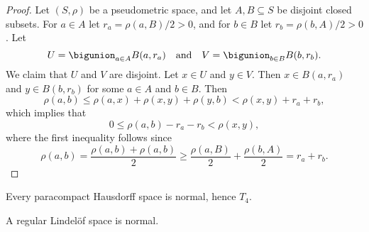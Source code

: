 \documentclass[article, a4paper, 11pt, oneside]{memoir}
\numberwithin{equation}{chapter}
\begin{document}
\begin{proof}
    Let $(S,\rho)$ be a pseudometric space, and let $A, B \subseteq S$ be disjoint closed subsets. For $a \in A$ let $r_a = \rho(a,B)/2 > 0$, and for $b \in B$ let $r_b = \rho(b,A)/2 > 0$. Let
    \begin{equation*}
        U = \bigunion_{a \in A} B(a,r_a)
        \quad \text{and} \quad
        V = \bigunion_{b \in B} B(b,r_b).
    \end{equation*}
    We claim that $U$ and $V$ are disjoint. Let $x \in U$ and $y \in V$. Then $x \in B(a,r_a)$ and $y \in B(b,r_b)$ for some $a \in A$ and $b \in B$. Then
    \begin{equation*}
        \rho(a,b)
            \leq \rho(a,x) + \rho(x,y) + \rho(y,b)
            < \rho(x,y) + r_a + r_b,
    \end{equation*}
    which implies that
    \begin{equation*}
        0
            \leq \rho(a,b) - r_a - r_b
            < \rho(x,y),
    \end{equation*}
    where the first inequality follows since
    \begin{equation*}
        \rho(a,b)
            = \frac{\rho(a,b) + \rho(a,b)}{2}
            \geq \frac{\rho(a,B)}{2} + \frac{\rho(b,A)}{2}
            = r_a + r_b.
    \end{equation*}
\end{proof}


\begin{proposition}
    \label{thm:paracompact-Hausdorff-is-normal}
    Every paracompact Hausdorff space is normal, hence $T_4$.
\end{proposition}


\begin{proposition}
    A regular Lindelöf space is normal.
\end{proposition}
\end{document}
